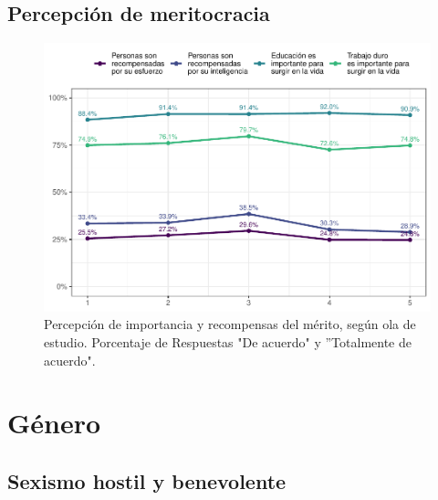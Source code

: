 \documentclass[
  12pt,
]{book}
\begin{document}
\hypertarget{percepciuxf3n-de-meritocracia}{%
\section{Percepción de meritocracia}\label{percepciuxf3n-de-meritocracia}}

\begin{figure}

{\centering \includegraphics{reporte-elsoc_files/figure-latex/merit-wave-1} 

}

\caption{Percepción de importancia y recompensas del mérito, según ola de estudio. Porcentaje de Respuestas "De acuerdo" y ”Totalmente de acuerdo".}\label{fig:merit-wave}
\end{figure}

\hypertarget{guxe9nero}{%
\chapter{Género}\label{guxe9nero}}

\hypertarget{sexismo-hostil-y-benevolente}{%
\section{Sexismo hostil y benevolente}\label{sexismo-hostil-y-benevolente}}
\end{document}
